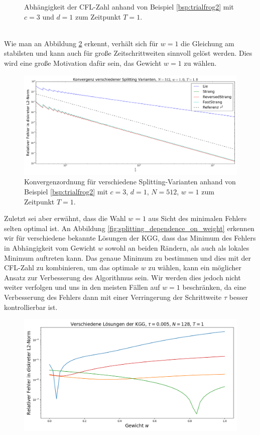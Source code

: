 \begin{mathbsp}
\begin{figure}[!htb]
\caption{Abhängigkeit der CFL-Zahl anhand von Beispiel \ref{bsp:trialfrog2} mit $c=3$ und $d=1$ zum Zeitpunkt $T=1$.}
\label{fig:splitting_cfl}
\end{figure}
\\[0.3cm]
Wie man an Abbildung \ref{fig:splitting_convergence_w1} erkennt, verhält sich für $w=1$ die Gleichung am stabilsten und kann auch für große Zeitschrittweiten sinnvoll gelöst werden. Dies wird eine große Motivation dafür sein, das Gewicht $w=1$ zu wählen.

\begin{figure}[!htb]
\includegraphics[width=\textwidth]{Figures/splitting_convergence_fix_weight_frog2_cfl_corrected.png}
\caption{Konvergenzordnung für verschiedene Splitting-Varianten anhand von Beispiel \ref{bsp:trialfrog2} mit $c=3$, $d=1$, $N=512$, $w=1$ zum Zeitpunkt $T=1$.}
\label{fig:splitting_convergence_w1}
\end{figure}
Zuletzt sei aber erwähnt, dass die Wahl $w=1$ aus Sicht des minimalen Fehlers selten optimal ist. An Abbildung \ref{fig:splitting_dependence_on_weight} erkennen wir für verschiedene bekannte Lösungen der KGG, dass das Minimum des Fehlers in Abhängigkeit vom Gewicht $w$ sowohl an beiden Rändern, als auch als lokales Minimum auftreten kann. Das genaue Minimum zu bestimmen und dies mit der CFL-Zahl zu kombinieren, um das optimale $w$ zu wählen, kann ein möglicher Ansatz zur Verbesserung des Algorithmus sein. Wir werden dies jedoch nicht weiter verfolgen und uns in den meisten Fällen auf $w=1$ beschränken, da eine Verbesserung des Fehlers dann mit einer Verringerung der Schrittweite $\tau$ besser kontrollierbar ist.
\begin{figure}[!htb]
\includegraphics[width=\textwidth]{Figures/splitting_error_over_weights.png}

\end{figure}
\end{mathbsp}
